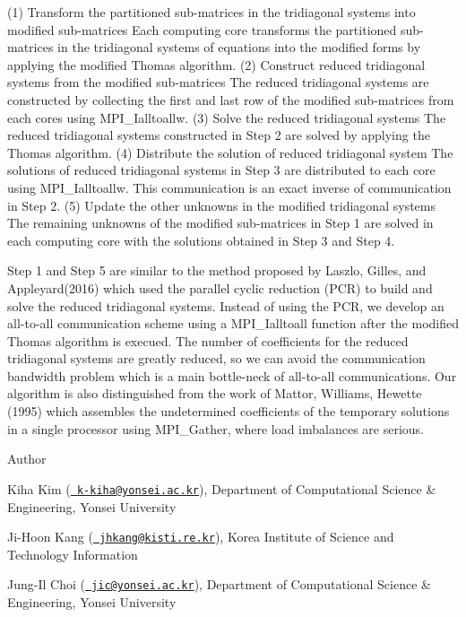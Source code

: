 (1) Transform the partitioned sub-\/matrices in the tridiagonal systems into modified sub-\/matrices Each computing core transforms the partitioned sub-\/matrices in the tridiagonal systems of equations into the modified forms by applying the modified Thomas algorithm. (2) Construct reduced tridiagonal systems from the modified sub-\/matrices The reduced tridiagonal systems are constructed by collecting the first and last row of the modified sub-\/matrices from each cores using M\+P\+I\+\_\+\+Ialltoallw. (3) Solve the reduced tridiagonal systems The reduced tridiagonal systems constructed in Step 2 are solved by applying the Thomas algorithm. (4) Distribute the solution of reduced tridiagonal system The solutions of reduced tridiagonal systems in Step 3 are distributed to each core using M\+P\+I\+\_\+\+Ialltoallw. This communication is an exact inverse of communication in Step 2. (5) Update the other unknowns in the modified tridiagonal systems The remaining unknowns of the modified sub-\/matrices in Step 1 are solved in each computing core with the solutions obtained in Step 3 and Step 4.

Step 1 and Step 5 are similar to the method proposed by Laszlo, Gilles, and Appleyard(2016) which used the parallel cyclic reduction (P\+CR) to build and solve the reduced tridiagonal systems. Instead of using the P\+CR, we develop an all-\/to-\/all communication scheme using a M\+P\+I\+\_\+\+Ialltoall function after the modified Thomas algorithm is execued. The number of coefficients for the reduced tridiagonal systems are greatly reduced, so we can avoid the communication bandwidth problem which is a main bottle-\/neck of all-\/to-\/all communications. Our algorithm is also distinguished from the work of Mattor, Williams, Hewette (1995) which assembles the undetermined coefficients of the temporary solutions in a single processor using M\+P\+I\+\_\+\+Gather, where load imbalances are serious.

\begin{DoxyAuthor}{Author}

\end{DoxyAuthor}

\begin{DoxyItemize}
\item Kiha Kim (\href{mailto:k-kiha@yonsei.ac.kr}{\texttt{ k-\/kiha@yonsei.\+ac.\+kr}}), Department of Computational Science \& Engineering, Yonsei University
\item Ji-\/\+Hoon Kang (\href{mailto:jhkang@kisti.re.kr}{\texttt{ jhkang@kisti.\+re.\+kr}}), Korea Institute of Science and Technology Information
\item Jung-\/\+Il Choi (\href{mailto:jic@yonsei.ac.kr}{\texttt{ jic@yonsei.\+ac.\+kr}}), Department of Computational Science \& Engineering, Yonsei University
\end{DoxyItemize}

